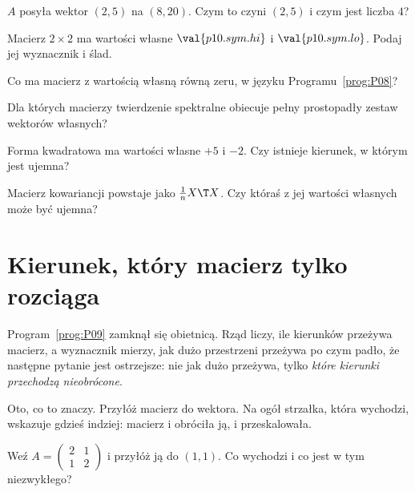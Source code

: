 \begin{quiz}
\item $A$ posyła wektor $(2,5)$ na $(8,20)$. Czym to czyni $(2,5)$ i czym
  jest liczba $4$? 
\item Macierz $2 \times 2$ ma wartości własne $\val{p10.sym.hi}$ i
  $\val{p10.sym.lo}$. Podaj jej wyznacznik i ślad. 
\item Co ma macierz z wartością własną równą zeru, w języku
  Programu~\ref{prog:P08}? 
\item Dla których macierzy twierdzenie spektralne obiecuje pełny prostopadły
  zestaw wektorów własnych? 
\item Forma kwadratowa ma wartości własne $+5$ i $-2$. Czy istnieje kierunek, w
  którym jest ujemna? 
\item Macierz kowariancji powstaje jako $\frac{1}{n}X\T X$. Czy któraś z jej
  wartości własnych może być ujemna? 
\end{quiz}

\section{Kierunek, który macierz tylko rozciąga}
\label{sec:P10-eigenvector}

\begin{fr}
Program~\ref{prog:P09} zamknął się obietnicą. Rząd liczy, ile kierunków
przeżywa macierz, a wyznacznik mierzy, jak dużo przestrzeni przeżywa \dash{} po
czym padło, że następne pytanie jest ostrzejsze: nie jak dużo przeżywa, tylko
\emph{które kierunki przechodzą nieobrócone}.

Oto, co to znaczy. Przyłóż macierz do wektora. Na ogół strzałka, która wychodzi,
wskazuje gdzieś indziej: macierz i obróciła ją, i przeskalowała.

Weź $A = \begin{pmatrix} 2 & 1 \\ 1 & 2 \end{pmatrix}$ i przyłóż ją do
$(1, 1)$. Co wychodzi i co jest w tym niezwykłego?
\dotline
\nextframe
\end{fr}


